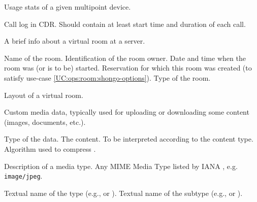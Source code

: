 \begin{Api}
Usage stats of a given multipoint device.
\begin{ApiClassAttributes}
 Call log in CDR. Should contain at least start time and duration of each call.
\end{ApiClassAttributes}

A brief info about a virtual room at a server.
\begin{ApiClassAttributes}
 Name of the room.
 Identification of the room owner.
 Date and time when the room was (or is to be) started.
 Reservation for which this room was created (to satisfy use-case \ref{UC:ops:room:shongo-options}).
 Type of the room.
\end{ApiClassAttributes}

Layout of a virtual room.
\begin{ApiEnumValues}
\end{ApiEnumValues}

Custom media data, typically used for uploading or downloading some content (images, documents, etc.).
\begin{ApiClassAttributes}
 Type of the data.
 The content. To be interpreted according to the content type.
 Algorithm used to compress .
\end{ApiClassAttributes}

Description of a media type. Any MIME Media Type listed by IANA \cite{IANA-MediaTypes}, e.g. \texttt{image/jpeg}.
\begin{ApiClassAttributes}
 Textual name of the type (e.g.,  or ).
 Textual name of the subtype (e.g.,  or ).
\end{ApiClassAttributes}


\end{Api}
